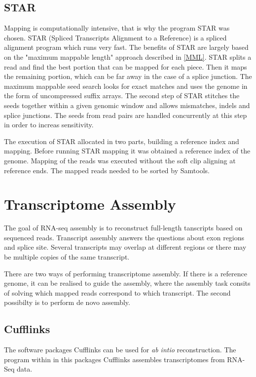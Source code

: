 \documentclass[11pt, a4paper]{report}
\begin{document}
\subsection*{STAR}
Mapping is computationally intensive, that is why the program STAR was chosen. STAR (Spliced Transcripts Alignment to a Reference) is a spliced alignment program which runs very fast. The benefits of STAR are largely based on the "maximum mappable length" approach described in \ref{MML}. STAR splits a read and find the best portion that can be mapped for each piece. Then it maps the remaining portion, which can be far away in the case of a splice junction. The maximum mappable seed search looks for exact matches and uses the genome in the form of uncompressed suffix arrays. The second step of STAR stitches the seeds together within a given genomic window and allows mismatches, indels and splice junctions. The seeds from read pairs are handled concurrently at this step in order to increas sensitivity. \cite{Dobin2013} \cite{Korpelainen2014} 

The execution of STAR allocated in two parts, building a reference index and mapping. Before running STAR mapping it was obtained a reference index of the genome. Mapping of the reads was executed without the soft clip aligning at reference ends. The mapped reads needed to be sorted by Samtools. 

\section{Transcriptome Assembly}
The goal of RNA-seq assembly is to reconstruct full-length tanscripts based on sequenced reads. 
Transcript assembly answers the questions about exon regions and splice site. Several transcripts may overlap at different regions or there may be multiple copies of the same transcript.

There are two ways of performing transcriptome assembly. If there is a reference genome, it can be realised to guide the assembly, where the assembly task consits of solving which mapped reads correspond to which transcript. The second possibilty is to perform de novo assembly. \cite{Korpelainen2014} 
\subsection*{Cufflinks}
The software packages Cufflinks can be used for \textit{ab intio} reconstruction. The program within in this packages Cufflinks assembles transcriptomes from RNA-Seq data. 
\end{document}
